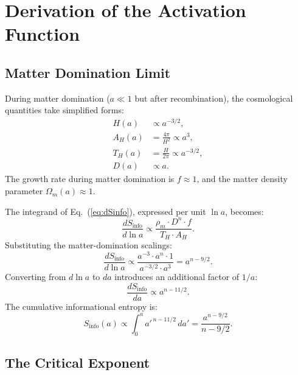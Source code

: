 \documentclass[11pt]{article}
\begin{document}
\section{Derivation of the Activation Function}
\label{sec:activation_derivation}

\subsection{Matter Domination Limit}

During matter domination ($a \ll 1$ but after recombination), the
cosmological quantities take simplified forms:
\begin{align}
H(a) &\propto a^{-3/2}, \label{eq:H_matter}\\
A_H(a) &= \frac{4\pi}{H^2} \propto a^3, \label{eq:AH_matter}\\
T_H(a) &= \frac{H}{2\pi} \propto a^{-3/2}, \label{eq:TH_matter}\\
D(a) &\propto a. \label{eq:D_matter}
\end{align}
The growth rate during matter domination is $f \approx 1$, and the
matter density parameter $\Omega_m(a) \approx 1$.

The integrand of Eq.~(\ref{eq:dSinfo}), expressed per unit $\ln a$, becomes:
\begin{equation}
\frac{dS_\mathrm{info}}{d\ln a} \propto
\frac{\rho_m \cdot D^n \cdot f}{T_H \cdot A_H}.
\end{equation}
Substituting the matter-domination scalings:
\begin{equation}
\frac{dS_\mathrm{info}}{d\ln a} \propto
\frac{a^{-3} \cdot a^n \cdot 1}{a^{-3/2} \cdot a^3} = a^{n - 9/2}.
\label{eq:scaling}
\end{equation}
Converting from $d\ln a$ to $da$ introduces an additional factor of $1/a$:
\begin{equation}
\frac{dS_\mathrm{info}}{da} \propto a^{n - 11/2}.
\end{equation}
The cumulative informational entropy is:
\begin{equation}
S_\mathrm{info}(a) \propto \int_0^a a'^{\,n - 11/2}\,da'
= \frac{a^{n-9/2}}{n - 9/2}.
\label{eq:integral}
\end{equation}

\subsection{The Critical Exponent}
\end{document}
